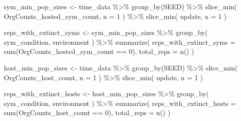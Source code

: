 \documentclass[
]{book}
\newenvironment{Shaded}{\begin{snugshade}}{\end{snugshade}}
\newcommand{\AttributeTok}[1]{\textcolor[rgb]{0.77,0.63,0.00}{#1}}
\newcommand{\DecValTok}[1]{\textcolor[rgb]{0.00,0.00,0.81}{#1}}
\newcommand{\FunctionTok}[1]{\textcolor[rgb]{0.00,0.00,0.00}{#1}}
\newcommand{\NormalTok}[1]{#1}
\newcommand{\OtherTok}[1]{\textcolor[rgb]{0.56,0.35,0.01}{#1}}
\newcommand{\SpecialCharTok}[1]{\textcolor[rgb]{0.00,0.00,0.00}{#1}}
\begin{document}
\begin{Shaded}
\begin{Highlighting}[]
\NormalTok{sym\_min\_pop\_sizes }\OtherTok{\textless{}{-}}\NormalTok{ time\_data }\SpecialCharTok{\%\textgreater{}\%}
  \FunctionTok{group\_by}\NormalTok{(SEED) }\SpecialCharTok{\%\textgreater{}\%}
  \FunctionTok{slice\_min}\NormalTok{(}
\NormalTok{    OrgCounts\_hosted\_sym\_count,}
    \AttributeTok{n =} \DecValTok{1}
\NormalTok{  ) }\SpecialCharTok{\%\textgreater{}\%}
  \FunctionTok{slice\_min}\NormalTok{(}
\NormalTok{    update,}
    \AttributeTok{n =} \DecValTok{1}
\NormalTok{  )}

\NormalTok{reps\_with\_extinct\_syms }\OtherTok{\textless{}{-}}\NormalTok{ sym\_min\_pop\_sizes }\SpecialCharTok{\%\textgreater{}\%}
  \FunctionTok{group\_by}\NormalTok{(}
\NormalTok{    sym\_condition,}
\NormalTok{    environment}
\NormalTok{  ) }\SpecialCharTok{\%\textgreater{}\%}
  \FunctionTok{summarize}\NormalTok{(}
    \AttributeTok{reps\_with\_extinct\_syms =} \FunctionTok{sum}\NormalTok{(OrgCounts\_hosted\_sym\_count }\SpecialCharTok{==} \DecValTok{0}\NormalTok{),}
    \AttributeTok{total\_reps =} \FunctionTok{n}\NormalTok{()}
\NormalTok{  )}

\NormalTok{host\_min\_pop\_sizes }\OtherTok{\textless{}{-}}\NormalTok{ time\_data }\SpecialCharTok{\%\textgreater{}\%}
  \FunctionTok{group\_by}\NormalTok{(SEED) }\SpecialCharTok{\%\textgreater{}\%}
  \FunctionTok{slice\_min}\NormalTok{(}
\NormalTok{    OrgCounts\_host\_count,}
    \AttributeTok{n =} \DecValTok{1}
\NormalTok{  ) }\SpecialCharTok{\%\textgreater{}\%}
  \FunctionTok{slice\_min}\NormalTok{(}
\NormalTok{    update,}
    \AttributeTok{n =} \DecValTok{1}
\NormalTok{  )}

\NormalTok{reps\_with\_extinct\_hosts }\OtherTok{\textless{}{-}}\NormalTok{ host\_min\_pop\_sizes }\SpecialCharTok{\%\textgreater{}\%}
  \FunctionTok{group\_by}\NormalTok{(}
\NormalTok{    sym\_condition,}
\NormalTok{    environment}
\NormalTok{  ) }\SpecialCharTok{\%\textgreater{}\%}
  \FunctionTok{summarize}\NormalTok{(}
    \AttributeTok{reps\_with\_extinct\_hosts =} \FunctionTok{sum}\NormalTok{(OrgCounts\_host\_count }\SpecialCharTok{==} \DecValTok{0}\NormalTok{),}
    \AttributeTok{total\_reps =} \FunctionTok{n}\NormalTok{()}
\NormalTok{  )}


\end{Highlighting}
\end{Shaded}
\end{document}

